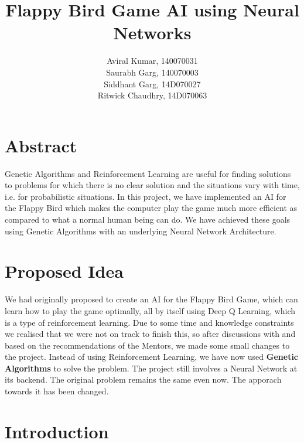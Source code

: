 \documentclass{article}
\begin{document}
\title{\textbf{Flappy Bird Game AI using Neural Networks}}
\author{Aviral Kumar, 140070031 \\Saurabh Garg, 140070003\\ Siddhant Garg, 14D070027\\ Ritwick Chaudhry, 14D070063 }

\maketitle
\pagebreak
\tableofcontents
\pagebreak

\section{Abstract}
Genetic Algorithms and Reinforcement Learning are useful for finding solutions to problems for which there is no clear solution and the situations vary with time, i.e. for probabilistic situations. In this project, we have implemented an AI for the Flappy Bird which makes the computer play the game much more efficient as compared to what a normal human being can do. We have achieved these goals using Genetic Algorithms with an underlying Neural Network Architecture.

\section{Proposed Idea}
We had originally proposed to create an AI for the Flappy Bird Game, which can learn how to play the game optimally, all by itself using Deep Q Learning, which is a type of reinforcement learning. Due to some time and knowledge constraints we realised that we were not on track to finish this, so after discussions with and based on the recommendations of the Mentors, we made some small changes to the project. Instead of using Reinforcement Learning, we have now used \textbf{Genetic Algorithms} to solve the problem. The project still involves a Neural Network at its backend. The original problem remains the same even now. The apporach towards it has been changed.   

\section{Introduction}	
\end{document}
